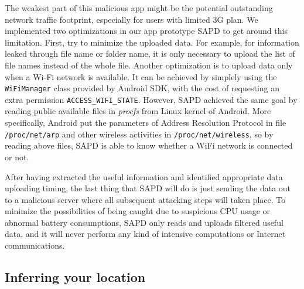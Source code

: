 \documentclass{sig-alternate}
\begin{document}
The weakest part of this malicious app might be the potential outstanding network traffic footprint, especially for users with limited 3G plan. We implemented two optimizations in our app prototype SAPD to get around this limitation. First, try to minimize the uploaded data. For example, for information leaked through file name or folder name, it is only necessary to upload the list of file names instead of the whole file. Another optimization is to upload data only when a Wi-Fi network is available. It can be achieved by simplely using the \texttt{WiFiManager} class provided by Android SDK, with the cost of requesting an extra permission \texttt{ACCESS\_WIFI\_STATE}. However, SAPD achieved the same goal by reading public available files in \textit{procfs} from Linux kernel of Android. More specifically, Android put the parameters of Address Resolution Protocol in file \texttt{/proc/net/arp} and other wireless activities in \texttt{/proc/net/wireless}, so by reading above files, SAPD is able to know whether a WiFi network is connected or not.


After having extracted the useful information and identified appropriate data uploading timing, the last thing that SAPD will do is just sending the data out to a malicious server where all subsequent attacking steps will taken place. To minimize the possibilities of being caught due to suspicious CPU usage or abnormal battery consumptions, SAPD only reads and uploads filtered useful data, and it will never perform any kind of intensive computations or Internet communications.



\subsection{Inferring your location}
\label{sec:attack3}

\begin{figure*}[ht]
\end{figure*}
\end{document}
